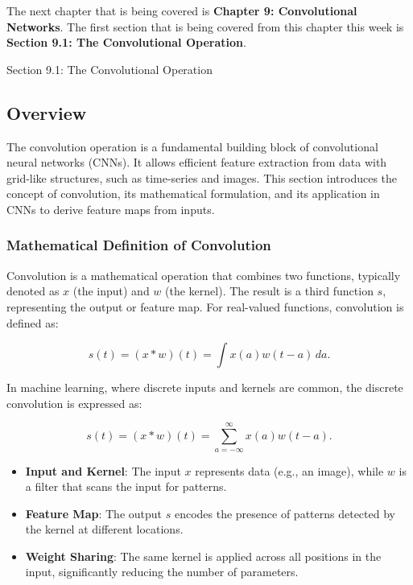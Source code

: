 The next chapter that is being covered is \textbf{Chapter 9: Convolutional Networks}.  The first section that is being covered from this chapter this week is \textbf{Section 9.1: The Convolutional Operation}.

\begin{notes}{Section 9.1: The Convolutional Operation}
    \subsection*{Overview}

    The convolution operation is a fundamental building block of convolutional neural networks (CNNs). It allows efficient feature extraction from data with grid-like structures, such as time-series and 
    images. This section introduces the concept of convolution, its mathematical formulation, and its application in CNNs to derive feature maps from inputs.
    
    \subsubsection*{Mathematical Definition of Convolution}
    
    Convolution is a mathematical operation that combines two functions, typically denoted as $x$ (the input) and $w$ (the kernel). The result is a third function $s$, representing the output or 
    feature map. For real-valued functions, convolution is defined as:
    
    \[
    s(t) = (x \ast w)(t) = \int x(a) w(t - a) \, da.
    \]
    
    In machine learning, where discrete inputs and kernels are common, the discrete convolution is expressed as:
    
    \[
    s(t) = (x \ast w)(t) = \sum_{a=-\infty}^{\infty} x(a) w(t - a).
    \]
    
    \begin{highlight}
        \begin{itemize}
            \item \textbf{Input and Kernel}: The input $x$ represents data (e.g., an image), while $w$ is a filter that scans the input for patterns.
            \item \textbf{Feature Map}: The output $s$ encodes the presence of patterns detected by the kernel at different locations.
            \item \textbf{Weight Sharing}: The same kernel is applied across all positions in the input, significantly reducing the number of parameters.
        \end{itemize}
    \end{highlight}
    

\end{notes}
